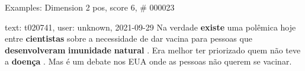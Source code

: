 \begin{frame}{Examples: Dimension 2 pos, score 6, \# 000023}
\footnotesize
\begin{exampleblock}{text: t020741, user: unknown, 2021-09-29}
Na verdade \textbf{existe} uma polêmica hoje entre \textbf{cientistas} sobre a 
necessidade de dar vacina para pessoas que \textbf{desenvolveram} 
\textbf{imunidade} \textbf{natural} . Era melhor ter priorizado quem não teve a 
\textbf{doença} . Mas é um debate nos EUA onde as pessoas não querem se 
vacinar. 
\end{exampleblock}
\end{frame}
